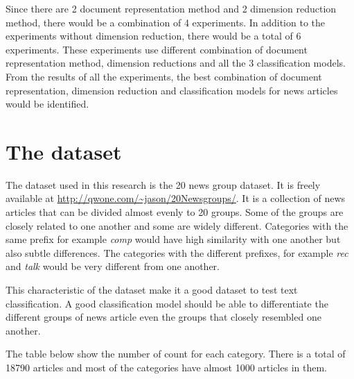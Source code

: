 Since there are 2 document representation method and 2 dimension reduction method, there would be a combination of 4 experiments. In addition to the experiments without dimension reduction, there would be a total of 6 experiments. These experiments use different combination of document representation method, dimension reductions and all the 3 classification models. From the results of all the experiments, the best combination of document representation, dimension reduction and classification models for news articles would be identified.

\section{The dataset}
\graphicspath{{./images/}}

The dataset used in this research is the 20 news group dataset. It is freely available at \url{http://qwone.com/~jason/20Newsgroups/}. It is a collection of news articles that can be divided almost evenly to 20 groups. Some of the groups are closely related to one another and some are widely different. Categories with the same prefix for example \textit{comp} would have high similarity with one another but also subtle differences. The categories with the different prefixes, for example \textit{rec} and \textit{talk} would be very different from one another.

This characteristic of the dataset make it a good dataset to test text classification. A good classification model should be able to differentiate the different groups of news article even the groups that closely resembled one another.

The table below show the number of count for each category. There is a total of 18790 articles and most of the categories have almost 1000 articles in them. 

